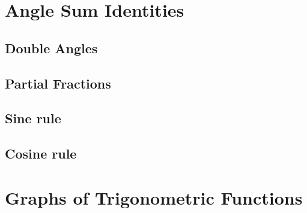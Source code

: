 
\chapter{Angle Sum Identities}

\section{Double Angles}

\section{Partial Fractions}

\section{Sine rule}
\section{Cosine rule}
\chapter{Graphs of Trigonometric Functions}

